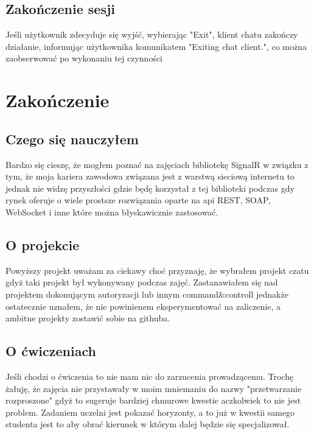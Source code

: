 \subsection{Zakończenie sesji}
\begin{spacing}{1.5} %
    Jeśli użytkownik zdecyduje się wyjść, wybierając "Exit", klient chatu zakończy działanie, informując użytkownika komunikatem "Exiting chat client.", co można zaobserwować po wykonaniu tej czynności
\end{spacing} %

\section{Zakończenie}

\subsection{Czego się nauczyłem}
\begin{spacing}{1.5} %
    Bardzo się cieszę, że mogłem poznać na zajęciach bibliotekę SignalR w związku z tym, że moja kariera zawodowa związana jest z warstwą sieciową internetu to jednak nie widzę przyszłości gdzie będę korzystał z tej biblioteki podczas gdy rynek oferuje o wiele prostsze rozwiązania oparte na api REST, SOAP, WebSocket i inne które można błyskawicznie zastosować.
\end{spacing} %

\subsection{O projekcie}
\begin{spacing}{1.5} %
    Powyższy projekt uważam za ciekawy choć przyznaję, że wybrałem projekt czatu gdyż taki projekt był wykonywany podczas zajęć. Zastanawiałem się nad projektem dokonującym autoryzacji lub innym command\&controll jednakże ostatecznie uznałem, że nie powinienem eksperymentować na zaliczenie, a ambitne projekty zostawić sobie na githuba.
\end{spacing} %

\subsection{O ćwiczeniach}
\begin{spacing}{1.5} %
    Jeśli chodzi o ćwiczenia to nie mam nic do zarzucenia prowadzącemu. Trochę żałuję, że zajęcia nie przystawały w moim mniemaniu do nazwy "przetwarzanie rozproszone" gdyż to sugeruje bardziej chmurowe kwestie aczkolwiek to nie jest problem. Zadaniem uczelni jest pokazać horyzonty, a to już w kwestii samego studenta jest to aby obrać kierunek w którym dalej będzie się specjalizował.
\end{spacing} %